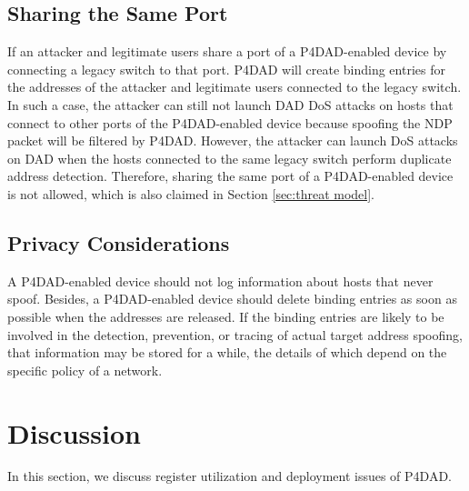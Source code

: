 \documentclass[journal]{IEEEtran}
\begin{document}
    \subsection{Sharing the Same Port}
        If an attacker and legitimate users share a port of a P4DAD-enabled device by connecting a legacy switch to that port. P4DAD will create binding entries for the addresses of the attacker and legitimate users connected to the legacy switch. In such a case, the attacker can still not launch DAD DoS attacks on hosts that connect to other ports of the P4DAD-enabled device because spoofing the NDP packet will be filtered by P4DAD. However, the attacker can launch DoS attacks on DAD when the hosts connected to the same legacy switch perform duplicate address detection. Therefore, sharing the same port of a P4DAD-enabled device is not allowed, which is also claimed in Section \ref{sec:threat model}.
        

    \subsection{Privacy Considerations}
        A P4DAD-enabled device should not log information about hosts that never spoof. Besides, a P4DAD-enabled device should delete binding entries as soon as possible when the addresses are released. If the binding entries are likely to be involved in the detection, prevention, or tracing of actual target address spoofing, that information may be stored for a while, the details of which depend on the specific policy of a network.   
         


\section{Discussion}\label{sec:discussion}
    In this section, we discuss register utilization and deployment issues of P4DAD. 
\end{document}
